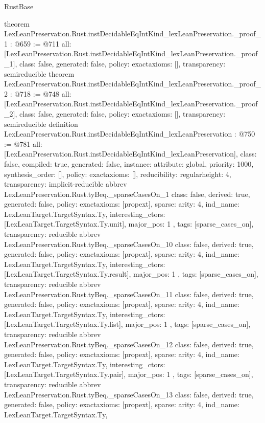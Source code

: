 \begin{lexlean}{RustBase}
\begin{coremodule}
{}
theorem LexLeanPreservation.Rust.instDecidableEqIntKind_lexLeanPreservation._proof_1 : @659 := @711 {
  all: [LexLeanPreservation.Rust.instDecidableEqIntKind_lexLeanPreservation._proof_1],
  class: false,
  generated: false,
  policy: exact{axioms: []},
  transparency: semireducible
}
theorem LexLeanPreservation.Rust.instDecidableEqIntKind_lexLeanPreservation._proof_2 : @718 := @748 {
  all: [LexLeanPreservation.Rust.instDecidableEqIntKind_lexLeanPreservation._proof_2],
  class: false,
  generated: false,
  policy: exact{axioms: []},
  transparency: semireducible
}
definition LexLeanPreservation.Rust.instDecidableEqIntKind_lexLeanPreservation : @750 := @781 {
  all: [LexLeanPreservation.Rust.instDecidableEqIntKind_lexLeanPreservation],
  class: false,
  compiled: true,
  generated: false,
  instance: {attribute: global, priority: 1000, synthesis_order: []},
  policy: exact{axioms: []},
  reducibility: regular{height: 4},
  transparency: implicit-reducible
}
abbrev LexLeanPreservation.Rust.tyBeq._sparseCasesOn_1 {
  class: false,
  derived: true,
  generated: false,
  policy: exact{axioms: [propext]},
  sparse: {
    arity: 4,
    ind_name: LexLeanTarget.TargetSyntax.Ty,
    interesting_ctors: [LexLeanTarget.TargetSyntax.Ty.unit],
    major_pos: 1
  },
  tags: [sparse_cases_on],
  transparency: reducible
}
abbrev LexLeanPreservation.Rust.tyBeq._sparseCasesOn_10 {
  class: false,
  derived: true,
  generated: false,
  policy: exact{axioms: [propext]},
  sparse: {
    arity: 4,
    ind_name: LexLeanTarget.TargetSyntax.Ty,
    interesting_ctors: [LexLeanTarget.TargetSyntax.Ty.result],
    major_pos: 1
  },
  tags: [sparse_cases_on],
  transparency: reducible
}
abbrev LexLeanPreservation.Rust.tyBeq._sparseCasesOn_11 {
  class: false,
  derived: true,
  generated: false,
  policy: exact{axioms: [propext]},
  sparse: {
    arity: 4,
    ind_name: LexLeanTarget.TargetSyntax.Ty,
    interesting_ctors: [LexLeanTarget.TargetSyntax.Ty.list],
    major_pos: 1
  },
  tags: [sparse_cases_on],
  transparency: reducible
}
abbrev LexLeanPreservation.Rust.tyBeq._sparseCasesOn_12 {
  class: false,
  derived: true,
  generated: false,
  policy: exact{axioms: [propext]},
  sparse: {
    arity: 4,
    ind_name: LexLeanTarget.TargetSyntax.Ty,
    interesting_ctors: [LexLeanTarget.TargetSyntax.Ty.pair],
    major_pos: 1
  },
  tags: [sparse_cases_on],
  transparency: reducible
}
abbrev LexLeanPreservation.Rust.tyBeq._sparseCasesOn_13 {
  class: false,
  derived: true,
  generated: false,
  policy: exact{axioms: [propext]},
  sparse: {
    arity: 4,
    ind_name: LexLeanTarget.TargetSyntax.Ty,
}}
\end{coremodule}
\end{lexlean}
